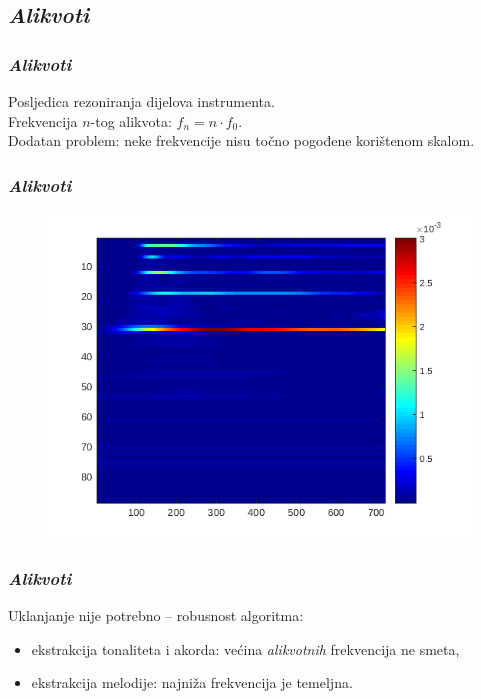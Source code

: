 \documentclass[11pt]{beamer}
\begin{document}
  \subsection{\protect\textit{Alikvoti}}
  \begin{frame}
    \frametitle{\textit{Alikvoti}}
    Posljedica rezoniranja dijelova instrumenta.\\
    \vspace{10pt}
    Frekvencija $n$-tog alikvota: $f_n = n \cdot f_0$.\\
    \vspace{10pt}
    Dodatan problem: neke frekvencije nisu točno pogođene korištenom skalom.
  \end{frame}
  \begin{frame}
    \frametitle{\textit{Alikvoti}}
    \begin{figure}
      \centering
      \includegraphics[height=0.9\textheight]{alikvoti.png}
    \end{figure}
  \end{frame}
    
  \begin{frame}
    \frametitle{\textit{Alikvoti}}
    Uklanjanje nije potrebno -- robusnost algoritma:
    \begin{itemize}
      \item ekstrakcija tonaliteta i akorda: većina \textit{alikvotnih} frekvencija ne smeta,
      \item ekstrakcija melodije: najniža frekvencija je temeljna.
    \end{itemize}
  \end{frame}
  
\end{document}

